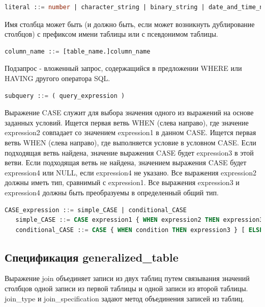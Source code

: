 \begin{lstlisting}[language=sql, label=some-code, caption=Спецификация SQL запроса]
   literal ::= number | character_string | binary_string | date_and_time_notation
\end{lstlisting}

Имя столбца может быть (и должно быть, если может возникнуть дублирование столбцов) с префиксом имени таблицы или с псевдонимом таблицы.

\begin{lstlisting}[language=sql, label=some-code, caption=Спецификация SQL запроса]
   column_name ::= [table_name.]column_name
\end{lstlisting}

Подзапрос - вложенный запрос, содержащийся в предложении WHERE или HAVING другого оператора SQL.

\begin{lstlisting}[language=sql, label=some-code, caption=Спецификация SQL запроса]
   subquery ::= ( query_expression )
\end{lstlisting}

Выражение CASE служит для выбора значения одного из выражений на основе заданных условий. 
Ищется первая ветвь WHEN (слева направо), где значение expression2 совпадает со значением expression1 в данном CASE. 
Ищется первая ветвь WHEN (слева направо), где выполняется условие в условном CASE. 
Если подходящая ветвь найдена, значение выражения CASE будет expression3 в этой ветви. 
Если подходящая ветвь не найдена, значением выражения CASE будет expression4 или NULL, если expression4 не указано.
Все выражения expression2 должны иметь тип, сравнимый с expression1. 
Все выражения expression3 и expression4 должны быть преобразуемы в определенный общий тип.

\begin{lstlisting}[language=sql, label=some-code, caption=Спецификация SQL запроса]
   CASE_expression ::= simple_CASE | conditional_CASE
   simple_CASE ::= CASE expression1 { WHEN expression2 THEN expression3 } [ ELSE expression4 ] END
   conditional_CASE ::= CASE { WHEN condition THEN expression3 } [ ELSE expression4 ] END
\end{lstlisting}

\subsection{Спецификация generalized\_table}

Выражение join объединяет записи из двух таблиц путем связывания значений 
столбцов одной записи из первой таблицы и одной записи из второй таблицы. 
join\_type и join\_specification задают метод объединения записей из таблиц.

